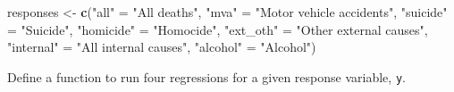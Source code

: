 \documentclass[]{book}
\newenvironment{Shaded}{\begin{snugshade}}{\end{snugshade}}
\newcommand{\KeywordTok}[1]{\textcolor[rgb]{0.13,0.29,0.53}{\textbf{#1}}}
\newcommand{\NormalTok}[1]{#1}
\newcommand{\StringTok}[1]{\textcolor[rgb]{0.31,0.60,0.02}{#1}}
\theoremstyle{definition}
\theoremstyle{definition}
\theoremstyle{definition}
\theoremstyle{remark}
\begin{document}
\begin{Shaded}
\begin{Highlighting}[]
\NormalTok{responses <-}\StringTok{ }\KeywordTok{c}\NormalTok{(}\StringTok{"all"}\NormalTok{ =}\StringTok{ "All deaths"}\NormalTok{,}
               \StringTok{"mva"}\NormalTok{ =}\StringTok{ "Motor vehicle accidents"}\NormalTok{,}
               \StringTok{"suicide"}\NormalTok{ =}\StringTok{ "Suicide"}\NormalTok{,}
               \StringTok{"homicide"}\NormalTok{ =}\StringTok{ "Homocide"}\NormalTok{,}
               \StringTok{"ext_oth"}\NormalTok{ =}\StringTok{ "Other external causes"}\NormalTok{,}
               \StringTok{"internal"}\NormalTok{ =}\StringTok{ "All internal causes"}\NormalTok{,}
               \StringTok{"alcohol"}\NormalTok{ =}\StringTok{ "Alcohol"}\NormalTok{)}
\end{Highlighting}
\end{Shaded}

Define a function to run four regressions for a given response variable,
\texttt{y}.
\end{document}

